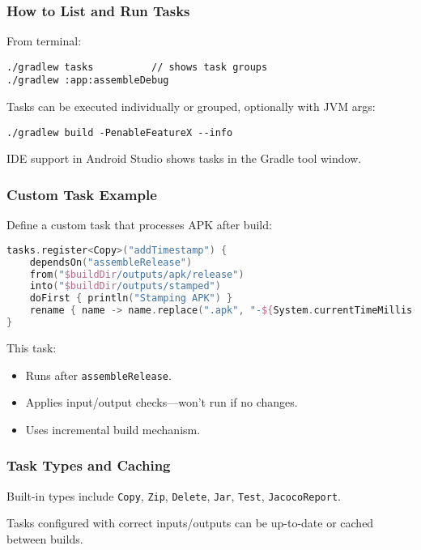 \documentclass[a4paper,12pt]{article}
\begin{document}
\subsubsection{How to List and Run Tasks}

From terminal:
\begin{lstlisting}
./gradlew tasks          // shows task groups
./gradlew :app:assembleDebug
\end{lstlisting}

Tasks can be executed individually or grouped, optionally with JVM args:
\begin{lstlisting}
./gradlew build -PenableFeatureX --info
\end{lstlisting}

IDE support in Android Studio shows tasks in the Gradle tool window.

\subsubsection{Custom Task Example}

Define a custom task that processes APK after build:

\begin{lstlisting}[language=Kotlin]
tasks.register<Copy>("addTimestamp") {
    dependsOn("assembleRelease")
    from("$buildDir/outputs/apk/release")
    into("$buildDir/outputs/stamped")
    doFirst { println("Stamping APK") }
    rename { name -> name.replace(".apk", "-${System.currentTimeMillis()}.apk") }
}
\end{lstlisting}

This task:
\begin{itemize}
  \item Runs after \texttt{assembleRelease}.
  \item Applies input/output checks—won’t run if no changes.
  \item Uses incremental build mechanism.
\end{itemize}

\subsubsection{Task Types and Caching}

Built-in types include \texttt{Copy}, \texttt{Zip}, \texttt{Delete}, \texttt{Jar}, \texttt{Test}, \texttt{JacocoReport}.

Tasks configured with correct inputs/outputs can be up-to-date or cached between builds.
\end{document}
